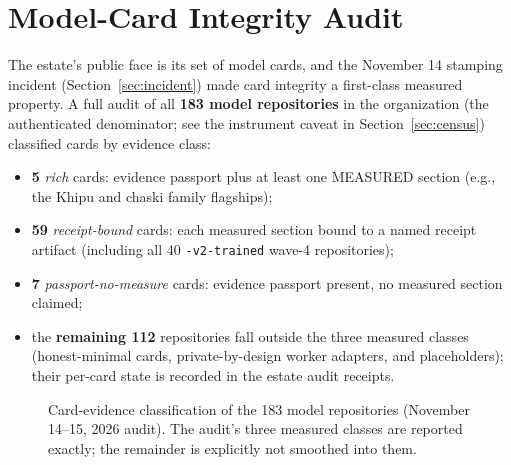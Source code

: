 ﻿\documentclass[11pt]{article}
\begin{document}
\section{Model-Card Integrity Audit}
\label{sec:cards}

The estate's public face is its set of model cards, and the November 14 stamping incident (Section~\ref{sec:incident}) made card integrity a first-class measured property. A full audit of all \textbf{183 model repositories} in the organization (the authenticated denominator; see the instrument caveat in Section~\ref{sec:census}) classified cards by evidence class:
\begin{itemize}
\item \textbf{5} \emph{rich} cards: evidence passport plus at least one MEASURED section (e.g., the Khipu and chaski family flagships);
\item \textbf{59} \emph{receipt-bound} cards: each measured section bound to a named receipt artifact (including all 40 \texttt{-v2-trained} wave-4 repositories);
\item \textbf{7} \emph{passport-no-measure} cards: evidence passport present, no measured section claimed;
\item the \textbf{remaining 112} repositories fall outside the three measured classes (honest-minimal cards, private-by-design worker adapters, and placeholders); their per-card state is recorded in the estate audit receipts.
\end{itemize}

\begin{figure}[htbp]
\centering
{}
\caption{Card-evidence classification of the 183 model repositories (November 14--15, 2026 audit). The audit's three measured classes are reported exactly; the remainder is explicitly not smoothed into them.}
\label{fig:cards}
\end{figure}
\end{document}
